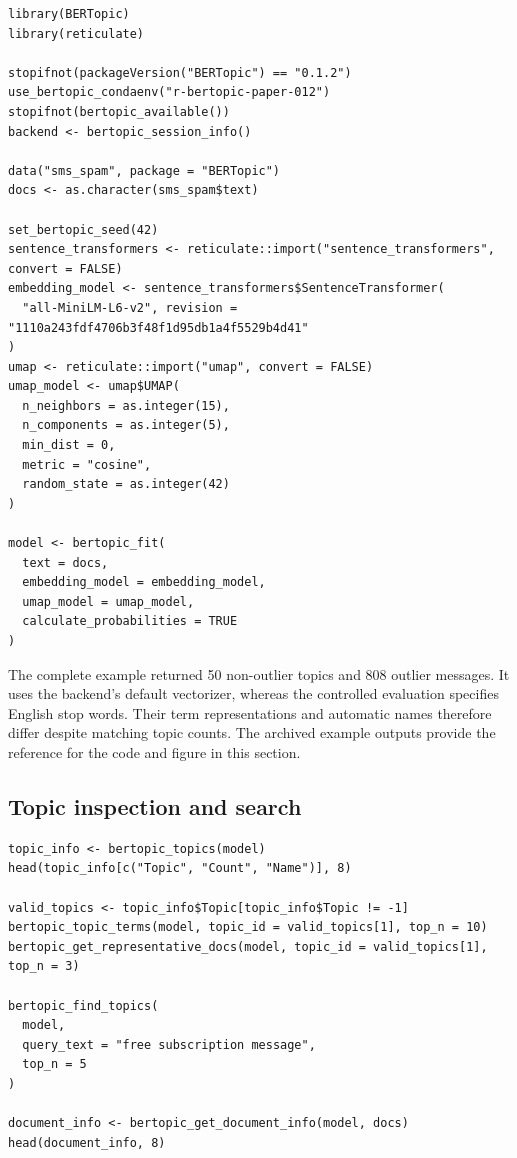 \documentclass[12pt]{article}
\begin{document}
\begin{lstlisting}[float=htbp,caption={Checking the backend and fitting a BERTopic model from R.}]
library(BERTopic)
library(reticulate)

stopifnot(packageVersion("BERTopic") == "0.1.2")
use_bertopic_condaenv("r-bertopic-paper-012")
stopifnot(bertopic_available())
backend <- bertopic_session_info()

data("sms_spam", package = "BERTopic")
docs <- as.character(sms_spam$text)

set_bertopic_seed(42)
sentence_transformers <- reticulate::import("sentence_transformers", convert = FALSE)
embedding_model <- sentence_transformers$SentenceTransformer(
  "all-MiniLM-L6-v2", revision = "1110a243fdf4706b3f48f1d95db1a4f5529b4d41"
)
umap <- reticulate::import("umap", convert = FALSE)
umap_model <- umap$UMAP(
  n_neighbors = as.integer(15),
  n_components = as.integer(5),
  min_dist = 0,
  metric = "cosine",
  random_state = as.integer(42)
)

model <- bertopic_fit(
  text = docs,
  embedding_model = embedding_model,
  umap_model = umap_model,
  calculate_probabilities = TRUE
)
\end{lstlisting}

The complete example returned 50 non-outlier topics and 808 outlier messages. It uses the backend's default vectorizer, whereas the controlled evaluation specifies English stop words. Their term representations and automatic names therefore differ despite matching topic counts. The archived example outputs provide the reference for the code and figure in this section.

\subsection{Topic inspection and search}

\begin{lstlisting}[caption={Inspecting and querying the fitted topic solution.}]
topic_info <- bertopic_topics(model)
head(topic_info[c("Topic", "Count", "Name")], 8)

valid_topics <- topic_info$Topic[topic_info$Topic != -1]
bertopic_topic_terms(model, topic_id = valid_topics[1], top_n = 10)
bertopic_get_representative_docs(model, topic_id = valid_topics[1], top_n = 3)

bertopic_find_topics(
  model,
  query_text = "free subscription message",
  top_n = 5
)

document_info <- bertopic_get_document_info(model, docs)
head(document_info, 8)
\end{lstlisting}
\end{document}
